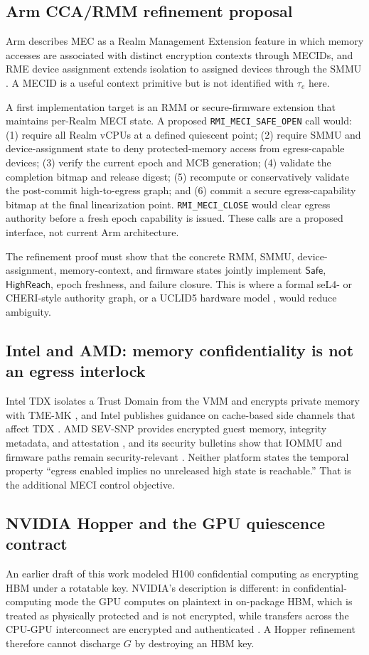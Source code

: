 \documentclass[11pt,letterpaper]{article}
\theoremstyle{plain}
\theoremstyle{definition}
\newcommand{\HR}{\mathsf{HighReach}}
\newcommand{\Safe}{\mathsf{Safe}}
\begin{document}
\subsection{Arm CCA/RMM refinement proposal}
Arm describes MEC as a Realm Management Extension feature in which memory accesses are associated with distinct encryption contexts through MECIDs, and RME device assignment extends isolation to assigned devices through the SMMU \cite{armmec,armrme}. A MECID is a useful context primitive but is not identified with $\tau_e$ here.

A first implementation target is an RMM or secure-firmware extension that maintains per-Realm MECI state. A proposed \texttt{RMI\_MECI\_SAFE\_OPEN} call would: (1) require all Realm vCPUs at a defined quiescent point; (2) require SMMU and device-assignment state to deny protected-memory access from egress-capable devices; (3) verify the current epoch and MCB generation; (4) validate the completion bitmap and release digest; (5) recompute or conservatively validate the post-commit high-to-egress graph; and (6) commit a secure egress-capability bitmap at the final linearization point. \texttt{RMI\_MECI\_CLOSE} would clear egress authority before a fresh epoch capability is issued. These calls are a proposed interface, not current Arm architecture.

The refinement proof must show that the concrete RMM, SMMU, device-assignment, memory-context, and firmware states jointly implement $\Safe$, $\HR$, epoch freshness, and failure closure. This is where a formal seL4- or CHERI-style authority graph, or a UCLID5 hardware model \cite{cheang2023}, would reduce ambiguity.

\subsection{Intel and AMD: memory confidentiality is not an egress interlock}
Intel TDX isolates a Trust Domain from the VMM and encrypts private memory with TME-MK \cite{inteltdx}, and Intel publishes guidance on cache-based side channels that affect TDX \cite{intelmktme}. AMD SEV-SNP provides encrypted guest memory, integrity metadata, and attestation \cite{amdsnp}, and its security bulletins show that IOMMU and firmware paths remain security-relevant \cite{amdsb3023}. Neither platform states the temporal property ``egress enabled implies no unreleased high state is reachable.'' That is the additional MECI control objective.

\subsection{NVIDIA Hopper and the GPU quiescence contract}
An earlier draft of this work modeled H100 confidential computing as encrypting HBM under a rotatable key. NVIDIA's description is different: in confidential-computing mode the GPU computes on plaintext in on-package HBM, which is treated as physically protected and is not encrypted, while transfers across the CPU-GPU interconnect are encrypted and authenticated \cite{nvidiawp,nvidiablog}. A Hopper refinement therefore cannot discharge $G$ by destroying an HBM key.
\end{document}
